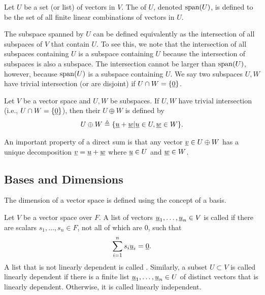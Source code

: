 \begin{definition}
Let $U$ be a set (or list) of vectors in $V$.
The  of $U$, denoted $\mathrm{span}(U)$, is defined to be the set of all finite linear combinations of vectors in $U$.
\end{definition}

The subspace spanned by $U$ can be defined equivalently as the intersection of all subspaces of $V$ that contain $U$.
To see this, we note that the intersection of all subspaces containing $U$ is a subspace containing $U$ because the intersection of subspaces is also a subspace.
The intersection cannot be larger than $\mathrm{span}(U)$, however, because $\mathrm{span}(U)$ is a subspace containing $U$.
We say two subspaces $U,W$ have trivial intersection (or are disjoint) if $U\cap W=\{\underline{0}\}$.

\begin{definition}
Let $V$ be a vector space and $U,W$ be subspaces.
If $U,W$ have trivial intersection (i.e., $U\cap W = \{ \underline{0} \}$), then their  $U \oplus W$ is defined by
\[ U \oplus W \triangleq \{\underline{u}+\underline{w} | \underline{u} \in U, \underline{w} \in W \}. \]
\end{definition}

An important property of a direct sum is that any vector $\underline{v} \in U \oplus W$ has a unique decomposition $\underline{v} = \underline{u} + \underline{w}$ where $\underline{u} \in U$ and $\underline{w} \in W$.
 
\subsection{Bases and Dimensions}
\label{section:BasesAndDimensions}

The dimension of a vector space is defined using the concept of a basis.

\begin{definition}
Let $V$ be a vector space over $F$.
A list of vectors $\underline{u}_1, \ldots, \underline{u}_n \in V $ is called  if there are scalars $s_1, \ldots, s_n \in F$, not all of which are $0$, such that
\begin{equation*}
\sum_{i=1}^n s_i \underline{u}_i = \underline{0}.
\end{equation*}
A list that is not linearly dependent is called .
Similarly, a subset $U \subset V$ is called linearly dependent if there is a finite list $\underline{u}_1, \ldots, \underline{u}_n \in U$ of distinct vectors that is linearly dependent.
Otherwise, it is called linearly independent.
\end{definition}

